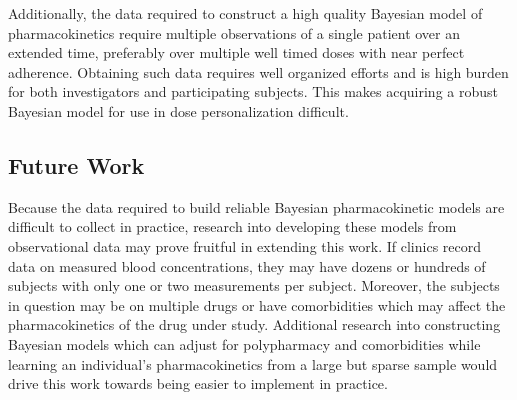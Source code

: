 Additionally, the data required to construct a high quality Bayesian model of pharmacokinetics require multiple observations of a single patient over an extended time, preferably over multiple well timed doses with near perfect adherence.  Obtaining such data requires well organized efforts and is high burden for both investigators and participating subjects.  This makes acquiring a robust Bayesian model for use in dose personalization difficult.

\subsection{Future Work}

Because the data required to build reliable Bayesian pharmacokinetic models are difficult to collect in practice, research into developing these models from observational data may prove fruitful in extending this work. If clinics record data on measured blood concentrations, they may have dozens or hundreds of subjects with only one or two measurements per subject.  Moreover, the subjects in question may be on multiple drugs or have comorbidities which may affect the pharmacokinetics of the drug under study.  Additional research into constructing Bayesian models which can adjust for polypharmacy and comorbidities while learning an individual’s pharmacokinetics from a large but sparse sample would drive this work towards being easier to implement in practice.


